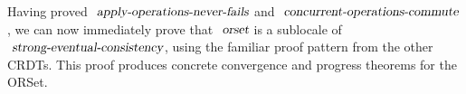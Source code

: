 Having proved $\isa{apply-operations-never-fails}$ and $\isa{concurrent-operations-commute}$, we can now immediately prove that $\isa{orset}$ is a sublocale of $\isa{strong-eventual-consistency}$, using the familiar proof pattern from the other CRDTs.
This proof produces concrete convergence and progress theorems for the ORSet.
